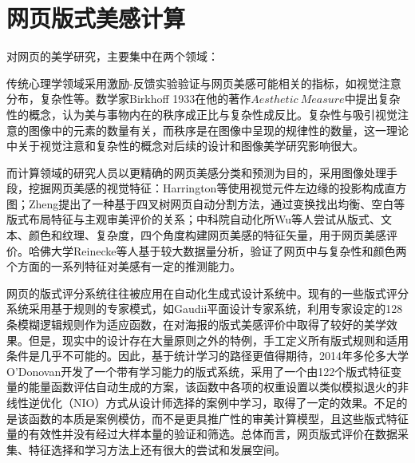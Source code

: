 \section{网页版式美感计算}

对网页的美学研究，主要集中在两个领域：

传统心理学领域采用激励-反馈实验验证与网页美感可能相关的指标，如视觉注意分布，复杂性等。数学家Birkhoff 1933在他的著作$Aesthetic ~Measure$中提出复杂性的概念，认为美与事物内在的秩序成正比与复杂性成反比。复杂性与吸引视觉注意的图像中的元素的数量有关，而秩序是在图像中呈现的规律性的数量，这一理论中关于视觉注意和复杂性的概念对后续的设计和图像美学研究影响很大。

而计算领域的研究人员以更精确的网页美感分类和预测为目的，采用图像处理手段，挖掘网页美感的视觉特征：Harrington等使用视觉元件左边缘的投影构成直方图；Zheng提出了一种基于四叉树网页自动分割方法，通过变换找出均衡、空白等版式布局特征与主观审美评价的关系；中科院自动化所Wu等人尝试从版式、文本、颜色和纹理、复杂度，四个角度构建网页美感的特征矢量，用于网页美感评价。哈佛大学Reinecke等人基于较大数据量分析，验证了网页中与复杂性和颜色两个方面的一系列特征对美感有一定的推测能力。

网页的版式评分系统往往被应用在自动化生成式设计系统中。现有的一些版式评分系统采用基于规则的专家模式，如Gaudii平面设计专家系统，利用专家设定的128条模糊逻辑规则作为适应函数，在对海报的版式美感评价中取得了较好的美学效果。但是，现实中的设计存在大量原则之外的特例，手工定义所有版式规则和适用条件是几乎不可能的。因此，基于统计学习的路径更值得期待，2014年多伦多大学O’Donovan开发了一个带有学习能力的版式系统，采用了一个由122个版式特征变量的能量函数评估自动生成的方案，该函数中各项的权重设置以类似模拟退火的非线性逆优化（NIO）方式从设计师选择的案例中学习，取得了一定的效果。不足的是该函数的本质是案例模仿，而不是更具推广性的审美计算模型，且这些版式特征量的有效性并没有经过大样本量的验证和筛选。总体而言，网页版式评价在数据采集、特征选择和学习方法上还有很大的尝试和发展空间。

